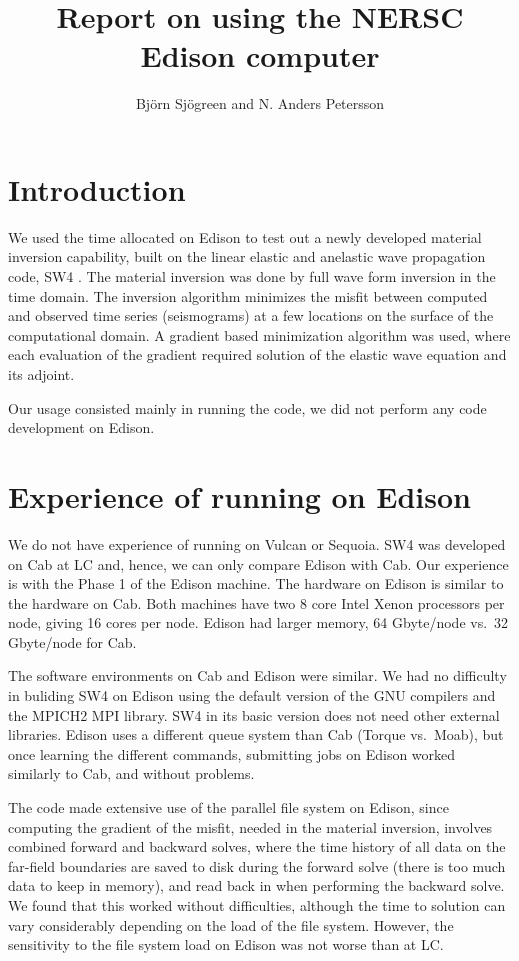 \documentclass[12pt]{article}
\begin{document}
\title{Report on using the NERSC Edison computer}

\author{Bj{\"o}rn Sj{\"o}green and N. Anders Petersson}

\maketitle

\section{Introduction}

We used the time allocated on Edison to test out a newly developed material 
inversion capability, built on the linear elastic and anelastic wave propagation code, SW4 \cite{SW4}. 
The material inversion was done by full wave form inversion in the time domain. 
The inversion algorithm minimizes the misfit between computed and observed time 
series (seismograms) at a few locations on the surface of the computational domain. 
A gradient based minimization algorithm was used, where each evaluation of the gradient required
solution of the elastic wave equation and its adjoint.

Our usage consisted mainly in running the code, we did not perform any code development on Edison.

\section{Experience of running on Edison}
We do not have experience of running on Vulcan or Sequoia. SW4 was developed on Cab at LC and, hence, we 
can only compare Edison with Cab.
Our experience is with the Phase 1 of the Edison machine. The hardware on Edison is similar to the hardware on 
Cab. Both machines have two 8 core Intel Xenon processors per node, giving 16 cores per node. Edison had larger
memory, 64 Gbyte/node vs.~32 Gbyte/node for Cab.

The software environments on Cab and Edison were similar. We had no difficulty in buliding SW4 on Edison 
using the default version of the GNU compilers and the MPICH2 MPI library. SW4 in its basic version 
does not need other external libraries. Edison uses a different queue system than Cab (Torque vs.~Moab), 
but once learning the different commands, submitting jobs on Edison worked similarly to Cab, and without problems.

The code made extensive use of the parallel file system on Edison, since computing the gradient of the misfit, needed
in the material inversion, involves combined forward and backward solves, where the time history of all data 
on the far-field boundaries are saved to disk during the forward solve (there is too much data to keep in
memory), and read back in when performing the backward solve. We found that this worked without 
difficulties, although the time to solution can vary considerably depending on the load of the file system.
However, the sensitivity to the file system load on Edison was not worse than at LC.
\end{document}
